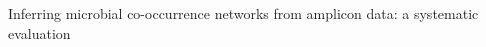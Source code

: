 \documentclass[letterpaper,12pt]{article}
\begin{document}


\begin{titlepage}

  \newcommand{\HRule}{\rule{\linewidth}{0.5mm}} %

  \center %





  \vspace*{\fill}
  {\huge Inferring microbial co-occurrence networks from amplicon data: a systematic evaluation}\\[0.4cm]



\end{titlepage}
\end{document}
